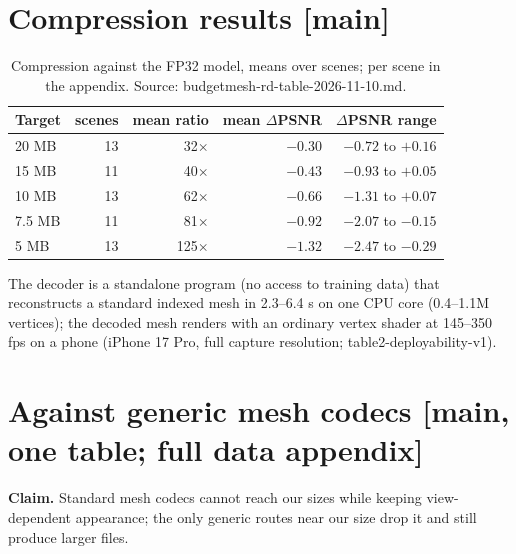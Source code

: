 \documentclass[10pt]{article}
\begin{document}
\section{Compression results [main]}
\label{sec:e4}
\begin{table}[H]\centering\small
\caption{Compression against the FP32 model, means over scenes; per scene in the appendix. Source: budgetmesh-rd-table-2026-11-10.md.}
\label{tab:e4}
\begin{tabular}{lrrrr}
\toprule
Target & scenes & mean ratio & mean $\Delta$PSNR & $\Delta$PSNR range \\
\midrule
20 MB & 13 & 32$\times$ & $-0.30$ & $-0.72$ to $+0.16$ \\
15 MB & 11 & 40$\times$ & $-0.43$ & $-0.93$ to $+0.05$ \\
10 MB & 13 & 62$\times$ & $-0.66$ & $-1.31$ to $+0.07$ \\
7.5 MB & 11 & 81$\times$ & $-0.92$ & $-2.07$ to $-0.15$ \\
5 MB & 13 & 125$\times$ & $-1.32$ & $-2.47$ to $-0.29$ \\
\bottomrule
\end{tabular}
\end{table}
\noindent The decoder is a standalone program (no access to training data) that reconstructs a standard indexed mesh in 2.3--6.4 s on one CPU core (0.4--1.1M vertices); the decoded mesh renders with an ordinary vertex shader at 145--350 fps on a phone (iPhone 17 Pro, full capture resolution; table2-deployability-v1).

\section{Against generic mesh codecs [main, one table; full data appendix]}
\label{sec:e5}
\textbf{Claim.} Standard mesh codecs cannot reach our sizes while keeping view-dependent appearance; the only generic routes near our size drop it and still produce larger files.
\end{document}
